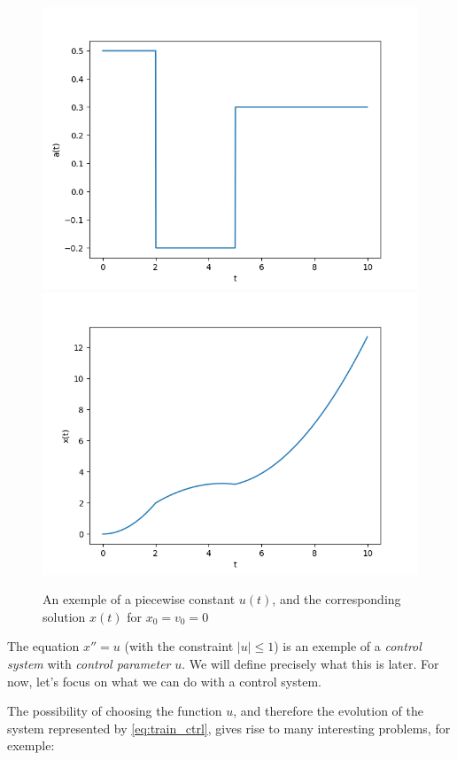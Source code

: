 \begin{figure}[H]
    \centering
    \includegraphics[scale = 0.5]{graf/piecewisecte.png}
    \includegraphics[scale=0.5]{graf/piecewisecte_sol.png}
    \caption{An exemple of a piecewise constant $u(t)$,
    and the corresponding solution $x(t)$ for
    $x_0=v_0=0$}
    \label{fig:piecewise_cte}
\end{figure}

The equation $x'' = u$ (with the constraint $|u| \leq 1$) is
an exemple of a \textit{control system} with \textit{control parameter}
$u$.
We will define precisely what this is later. For now, let's focus on what we
can do with a control system.

The possibility
of choosing the function $u$, and therefore the evolution
of the system represented by \autoref{eq:train_ctrl},
gives rise to many interesting problems, for exemple:

